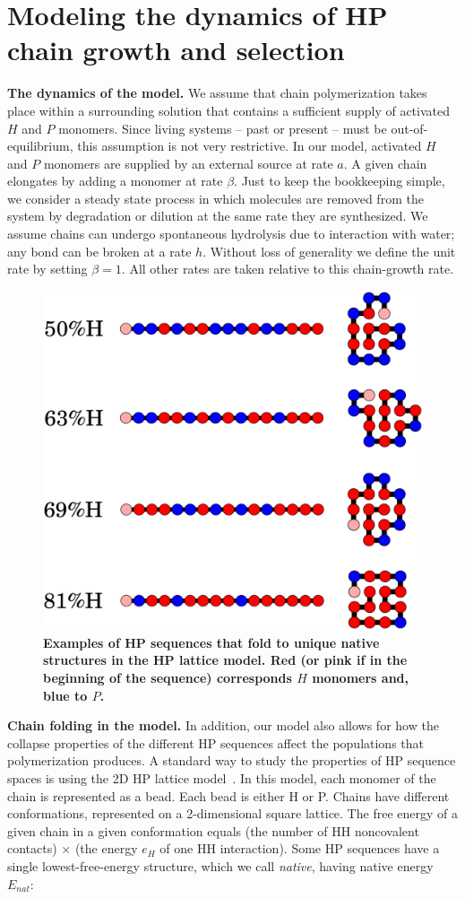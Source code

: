 \documentclass[twocolumn,letterpaper]{revtex4}
\begin{document}
\section*{Modeling the dynamics of HP chain growth and selection}
 
 \textbf{The dynamics of the model.}  We assume that chain polymerization takes place within a 
surrounding solution that contains a sufficient supply of activated $H$ and $P$ monomers.  Since 
living systems -- past or present -- must be out-of-equilibrium, this 
assumption is not very restrictive.  In our model, activated $H$ and $P$ monomers are supplied by 
an external source at rate $a$.  A given chain elongates by adding a monomer at rate $\beta$.  Just 
to keep the bookkeeping simple, we consider a steady state process in which molecules are removed 
from the system by degradation or dilution at the same rate they are 
synthesized.  We assume chains can undergo spontaneous hydrolysis due to interaction with water; 
any bond can be broken at a rate $h$. Without loss of generality we define the unit rate by 
setting 
$\beta = 1$.  All other rates are taken relative to this chain-growth rate.
 
 \begin{figure}[ht!]
  \centering
  \includegraphics[width=0.8\columnwidth]{pictures/tst-seqs.pdf} 
  \caption{\footnotesize{\bf{Examples of HP sequences that fold to unique native structures in the 
HP lattice model.} Red (or pink if in the beginning of the sequence) corresponds $H$ monomers and, 
blue to $P$.}}
  \label{fig:hydro-effect}
\end{figure}
 \textbf{Chain folding in the model.}  In addition, our model also allows for how the collapse 
properties of the different HP sequences affect the populations that polymerization produces.  A 
standard way to study the properties of HP sequence spaces is using the 2D HP lattice 
model~\cite{lau1989lattice,Chan1991}.  In this model, each monomer of the chain is represented as 
a 
bead.  Each bead is either H or P.  Chains have different conformations, represented on a 
2-dimensional square lattice.  The free energy of a given chain in a given conformation equals 
(the 
number of HH noncovalent contacts) $\times$ (the energy $e_H$ of one HH interaction).  Some HP 
sequences have a single lowest-free-energy structure, which we call \emph{native}, having native 
energy $E_{nat}$:
\end{document}
